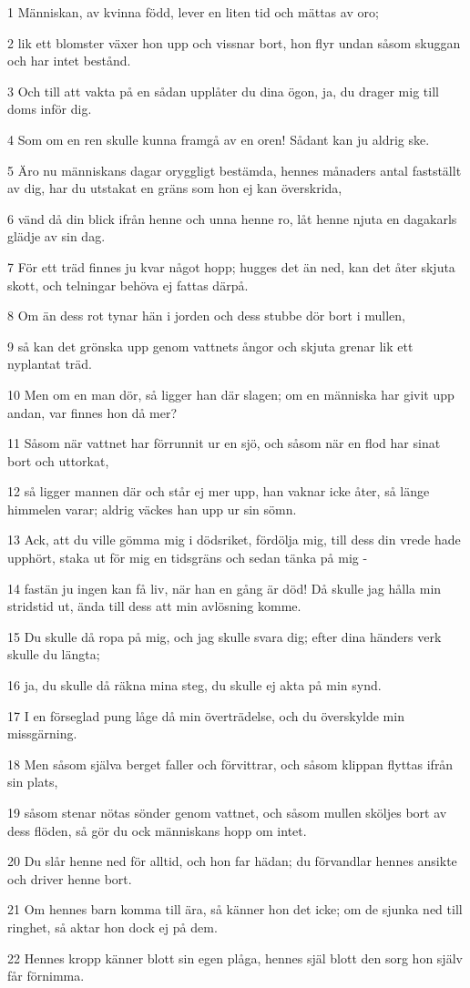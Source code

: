 \par 1 Människan, av kvinna född, lever en liten tid och mättas av oro;
\par 2 lik ett blomster växer hon upp och vissnar bort, hon flyr undan såsom skuggan och har intet bestånd.
\par 3 Och till att vakta på en sådan upplåter du dina ögon, ja, du drager mig till doms inför dig.
\par 4 Som om en ren skulle kunna framgå av en oren! Sådant kan ju aldrig ske.
\par 5 Äro nu människans dagar oryggligt bestämda, hennes månaders antal fastställt av dig, har du utstakat en gräns som hon ej kan överskrida,
\par 6 vänd då din blick ifrån henne och unna henne ro, låt henne njuta en dagakarls glädje av sin dag.
\par 7 För ett träd finnes ju kvar något hopp; hugges det än ned, kan det åter skjuta skott, och telningar behöva ej fattas därpå.
\par 8 Om än dess rot tynar hän i jorden och dess stubbe dör bort i mullen,
\par 9 så kan det grönska upp genom vattnets ångor och skjuta grenar lik ett nyplantat träd.
\par 10 Men om en man dör, så ligger han där slagen; om en människa har givit upp andan, var finnes hon då mer?
\par 11 Såsom när vattnet har förrunnit ur en sjö, och såsom när en flod har sinat bort och uttorkat,
\par 12 så ligger mannen där och står ej mer upp, han vaknar icke åter, så länge himmelen varar; aldrig väckes han upp ur sin sömn.
\par 13 Ack, att du ville gömma mig i dödsriket, fördölja mig, till dess din vrede hade upphört, staka ut för mig en tidsgräns och sedan tänka på mig -
\par 14 fastän ju ingen kan få liv, när han en gång är död! Då skulle jag hålla min stridstid ut, ända till dess att min avlösning komme.
\par 15 Du skulle då ropa på mig, och jag skulle svara dig; efter dina händers verk skulle du längta;
\par 16 ja, du skulle då räkna mina steg, du skulle ej akta på min synd.
\par 17 I en förseglad pung låge då min överträdelse, och du överskylde min missgärning.
\par 18 Men såsom själva berget faller och förvittrar, och såsom klippan flyttas ifrån sin plats,
\par 19 såsom stenar nötas sönder genom vattnet, och såsom mullen sköljes bort av dess flöden, så gör du ock människans hopp om intet.
\par 20 Du slår henne ned för alltid, och hon far hädan; du förvandlar hennes ansikte och driver henne bort.
\par 21 Om hennes barn komma till ära, så känner hon det icke; om de sjunka ned till ringhet, så aktar hon dock ej på dem.
\par 22 Hennes kropp känner blott sin egen plåga, hennes själ blott den sorg hon själv får förnimma.

